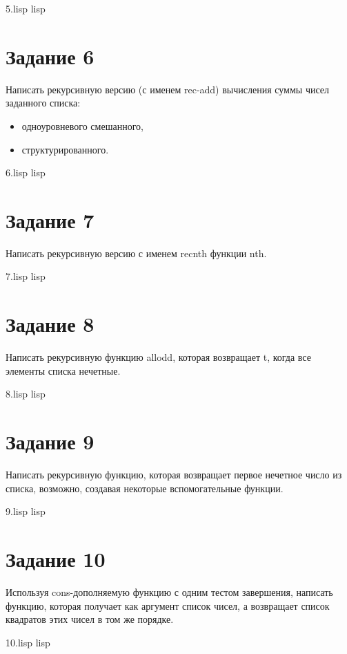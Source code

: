 {5.lisp}
{lisp}
{}


\section{Задание 6}
Написать рекурсивную версию (с именем rec-add) вычисления суммы чисел заданного списка:
\begin{itemize}
	\item одноуровневого смешанного,
	\item структурированного.
\end{itemize}

{6.lisp}
{lisp}
{}

\section{Задание 7}
Написать рекурсивную версию с именем recnth функции nth.

{7.lisp}
{lisp}
{}

\section{Задание 8}
Написать рекурсивную функцию allodd, которая возвращает t, когда все элементы списка нечетные.

{8.lisp}
{lisp}
{}


\section{Задание 9}
Написать рекурсивную функцию, которая возвращает первое нечетное число из списка, возможно, создавая некоторые вспомогательные функции.

{9.lisp}
{lisp}
{}

\section{Задание 10}
Используя cons-дополняемую функцию с одним тестом завершения, написать функцию, которая получает как аргумент список чисел, а возвращает список квадратов этих чисел в том же порядке.

{10.lisp}
{lisp}
{}